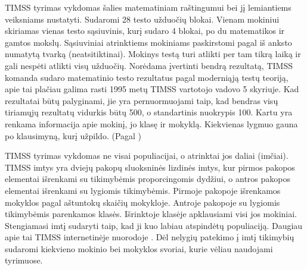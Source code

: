 \documentclass[11pt,a4paper]{article}
\begin{document}
\indent TIMSS tyrimas vykdomas šalies matematiniam raštingumui bei jį lemiantiems veiksniams nustatyti. Sudaromi 28 testo užduočių blokai. Vienam mokiniui skiriamas vienas testo sąsiuvinis, kurį sudaro 4 blokai, po du matematikos ir gamtos mokslų. Sąsiuviniai atrinktiems mokiniams paskirstomi pagal iš anksto numatytą tvarką (neatsitiktinai). Mokinys testą turi atlikti per tam tikrą laiką ir gali nespėti atlikti visų užduočių. Norėdama įvertinti bendrą rezultatą, TIMSS komanda sudaro matematinio testo rezultatus pagal moderniąją testų teoriją, apie tai plačiau galima rasti 1995 metų TIMSS vartotojo vadovo \cite{timss1995} 5 skyriuje. Kad rezultatai būtų palyginami, jie yra pernuormuojami taip, kad bendras visų tiriamųjų rezultatų vidurkis būtų 500, o standartinis nuokrypis 100. Kartu yra renkama informacija apie mokinį, jo klasę ir mokyklą. Kiekvienas lygmuo gauna po klausimyną, kurį užpildo. (Pagal \cite{timss2011lt})

\indent TIMSS tyrimas vykdomas ne visai populiacijai, o atrinktai jos daliai (imčiai). TIMSS imtys yra dviejų pakopų sluoksninės lizdinės imtys, kur pirmos pakopos elementai išrenkami su tikimybėmis proporcingomis dydžiui, o antros pakopos elementai išrenkami su lygiomis tikimybėmis. Pirmoje pakopoje išrenkamos mokyklos pagal aštuntokų skaičių mokykloje. Antroje pakopoje su lygiomis tikimybėmis parenkamos klasės. Išrinktoje klasėje apklausiami visi jos mokiniai. Stengiamasi imtį sudaryti taip, kad ji kuo labiau atspindėtų populiaciją. Daugiau apie tai TIMSS internetinėje nuorodoje \cite{2011Sample}. Dėl nelygių patekimo į imtį tikimybių sudaromi kiekvieno mokinio bei mokyklos svoriai, kurie vėliau naudojami tyrimuose.
\end{document}
